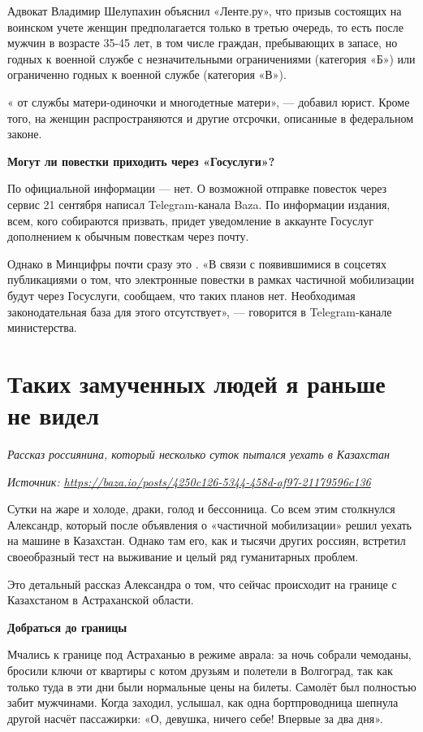 Адвокат Владимир Шелупахин объяснил «Ленте.ру», что призыв состоящих на воинском учете женщин предполагается только в третью очередь, то есть после мужчин в возрасте 35-45 лет, в том числе граждан, пребывающих в запасе, но годных к военной службе с незначительными ограничениями (категория «Б») или ограниченно годных к военной службе (категория «В»).

«  от службы матери-одиночки и многодетные матери», — добавил юрист. Кроме того, на женщин распространяются и другие отсрочки, описанные в федеральном законе.

\textbf{Могут ли повестки приходить через «Госуслуги»?}

По официальной информации — нет. О возможной отправке повесток через сервис  21 сентября написал Telegram-канала Baza. По информации издания, всем, кого собираются призвать, придет уведомление в аккаунте Госуслуг дополнением к обычным повесткам через почту.

Однако в Минцифры почти сразу это . «В связи с появившимися в соцсетях публикациями о том, что электронные повестки в рамках частичной мобилизации будут  через Госуслуги, сообщаем, что таких планов нет. Необходимая законодательная база для этого отсутствует», — говорится в Telegram-канале министерства.

\newpage
\section{Таких замученных людей я раньше не видел}

\textit{Рассказ россиянина, который несколько суток пытался уехать в Казахстан }

\textit{Источник: \url{https://baza.io/posts/4250c126-5344-458d-af97-21179596c136}}

Сутки на жаре и холоде, драки, голод и бессонница. Со всем этим столкнулся Александр, который после объявления о «частичной мобилизации» решил уехать на машине в Казахстан. Однако там его, как и тысячи других россиян, встретил своеобразный тест на выживание и целый ряд гуманитарных проблем.

Это детальный рассказ Александра о том, что сейчас происходит на границе с Казахстаном в Астраханской области.


\textbf{Добраться до границы}

Мчались к границе под Астраханью в режиме аврала: за ночь собрали чемоданы, бросили ключи от квартиры с котом друзьям и полетели в Волгоград, так как только туда в эти дни были нормальные цены на билеты. Самолёт был полностью забит мужчинами. Когда заходил, услышал, как одна бортпроводница шепнула другой насчёт пассажирки: «О, девушка, ничего себе! Впервые за два дня».

